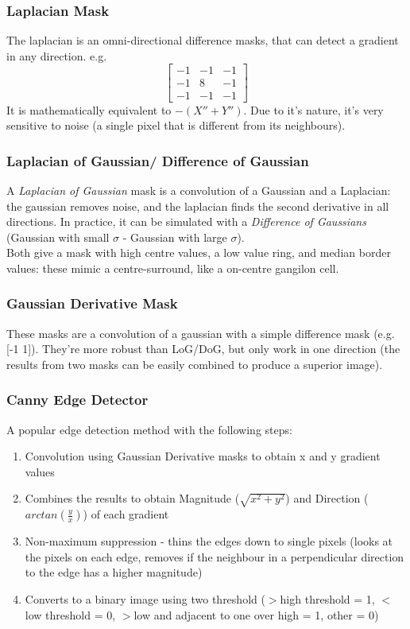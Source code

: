 \subsubsection{Laplacian Mask}
The laplacian is an omni-directional difference masks, that can detect a gradient in any direction. e.g. 
\[
    \begin{bmatrix}
    -1 & -1 & -1 \\
    -1 & 8 & -1 \\
    -1 & -1 & -1 
    \end{bmatrix}
\]
It is mathematically equivalent to $-(X'' + Y'')$. Due to it's nature, it's very sensitive to noise (a single pixel that is different from its neighbours). 

\subsubsection{Laplacian of Gaussian/ Difference of Gaussian}
A \emph{Laplacian of Gaussian} mask is a convolution of a Gaussian and a Laplacian: the gaussian removes noise, and the laplacian finds the second derivative in all directions. In practice, it can be simulated with a \emph{Difference of Gaussians} (Gaussian with small $\sigma$ - Gaussian with large $\sigma$).\\

Both give a mask with high centre values, a low value ring, and median border values: these mimic a centre-surround, like a on-centre gangilon cell. 
\subsubsection{Gaussian Derivative Mask}
These masks are a convolution of a gaussian with a simple difference mask (e.g. [-1 1]). They're more robust than LoG/DoG, but only work in one direction (the results from two masks can be easily combined to produce a superior image).

\subsubsection{Canny Edge Detector}
A popular edge detection method with the following steps:
\begin{enumerate}
    \item Convolution using Gaussian Derivative masks to obtain x and y gradient values
    \item Combines the results to obtain Magnitude ($\sqrt{x^2 + y^2}$) and Direction ($arctan(\frac{y}{x})$) of each gradient
    \item Non-maximum suppression - thins the edges down to single pixels (looks at the pixels on each edge, removes if the neighbour in a perpendicular direction to the edge has a higher magnitude)
    \item Converts to a binary image using two threshold ($>$high threshold = 1, $<$low threshold = 0, $>$low and adjacent to one over high = 1, other = 0)
\end{enumerate}

